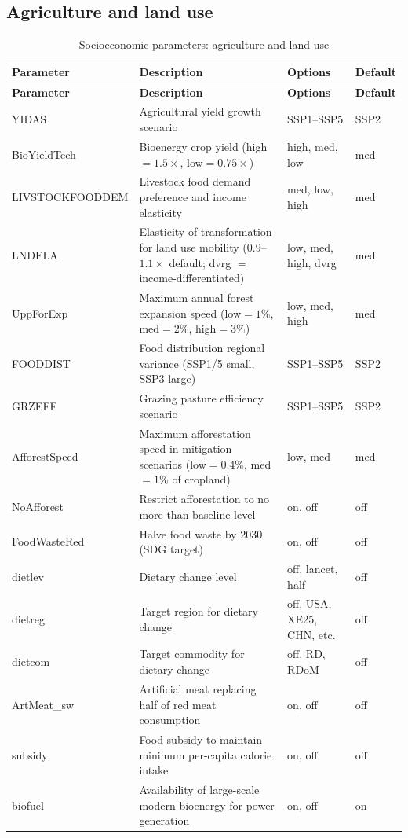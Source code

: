 \documentclass[10pt,a4paper,titlepage,dvipdfmx]{book}
\begin{document}
\subsection{Agriculture and land use}
\begin{longtable}{|p{}|p{}|p{}|p{}|}
\caption{Socioeconomic parameters: agriculture and land use}\label{tab:sp-soc-aglu}\\
\hline
\textbf{Parameter} & \textbf{Description} & \textbf{Options} & \textbf{Default} \\ \hline
\endfirsthead
\hline
\textbf{Parameter} & \textbf{Description} & \textbf{Options} & \textbf{Default} \\ \hline
\endhead
\hline
\endfoot
YIDAS & Agricultural yield growth scenario & SSP1--SSP5 & SSP2 \\ \hline
BioYieldTech & Bioenergy crop yield (high$=1.5\times$, low$=0.75\times$) & high, med, low & med \\ \hline
LIVSTOCKFOODDEM & Livestock food demand preference and income elasticity & med, low, high & med \\ \hline
LNDELA & Elasticity of transformation for land use mobility ($0.9$--$1.1\times$ default; dvrg $=$ income-differentiated) & low, med, high, dvrg & med \\ \hline
UppForExp & Maximum annual forest expansion speed (low$=1\%$, med$=2\%$, high$=3\%$) & low, med, high & med \\ \hline
FOODDIST & Food distribution regional variance (SSP1/5 small, SSP3 large) & SSP1--SSP5 & SSP2 \\ \hline
GRZEFF & Grazing pasture efficiency scenario & SSP1--SSP5 & SSP2 \\ \hline
AfforestSpeed & Maximum afforestation speed in mitigation scenarios (low$=0.4\%$, med$=1\%$ of cropland) & low, med & med \\ \hline
NoAfforest & Restrict afforestation to no more than baseline level & on, off & off \\ \hline
FoodWasteRed & Halve food waste by 2030 (SDG target) & on, off & off \\ \hline
dietlev & Dietary change level & off, lancet, half & off \\ \hline
dietreg & Target region for dietary change & off, USA, XE25, CHN, etc. & off \\ \hline
dietcom & Target commodity for dietary change & off, RD, RDoM & off \\ \hline
ArtMeat\_sw & Artificial meat replacing half of red meat consumption & on, off & off \\ \hline
subsidy & Food subsidy to maintain minimum per-capita calorie intake & on, off & off \\ \hline
biofuel & Availability of large-scale modern bioenergy for power generation & on, off & on \\ \hline
\end{longtable}
\end{document}
